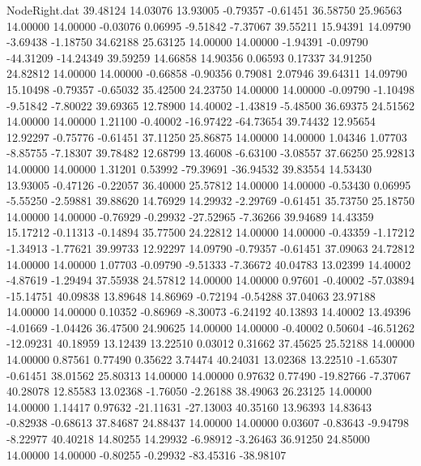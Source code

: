 \begin{filecontents}{NodeRight.dat}
  39.48124   14.03076   13.93005    -0.79357   -0.61451   36.58750   25.96563   14.00000   14.00000   -0.03076    0.06995   -9.51842   -7.37067
  39.55211   15.94391   14.09790    -3.69438   -1.18750   34.62188   25.63125   14.00000   14.00000   -1.94391   -0.09790  -44.31209  -14.24349
  39.59259   14.66858   14.90356     0.06593    0.17337   34.91250   24.82812   14.00000   14.00000   -0.66858   -0.90356    0.79081    2.07946
  39.64311   14.09790   15.10498    -0.79357   -0.65032   35.42500   24.23750   14.00000   14.00000   -0.09790   -1.10498   -9.51842   -7.80022
  39.69365   12.78900   14.40002    -1.43819   -5.48500   36.69375   24.51562   14.00000   14.00000    1.21100   -0.40002  -16.97422  -64.73654
  39.74432   12.95654   12.92297    -0.75776   -0.61451   37.11250   25.86875   14.00000   14.00000    1.04346    1.07703   -8.85755   -7.18307
  39.78482   12.68799   13.46008    -6.63100   -3.08557   37.66250   25.92813   14.00000   14.00000    1.31201    0.53992  -79.39691  -36.94532
  39.83554   14.53430   13.93005    -0.47126   -0.22057   36.40000   25.57812   14.00000   14.00000   -0.53430    0.06995   -5.55250   -2.59881
  39.88620   14.76929   14.29932    -2.29769   -0.61451   35.73750   25.18750   14.00000   14.00000   -0.76929   -0.29932  -27.52965   -7.36266
  39.94689   14.43359   15.17212    -0.11313   -0.14894   35.77500   24.22812   14.00000   14.00000   -0.43359   -1.17212   -1.34913   -1.77621
  39.99733   12.92297   14.09790    -0.79357   -0.61451   37.09063   24.72812   14.00000   14.00000    1.07703   -0.09790   -9.51333   -7.36672
  40.04783   13.02399   14.40002    -4.87619   -1.29494   37.55938   24.57812   14.00000   14.00000    0.97601   -0.40002  -57.03894  -15.14751
  40.09838   13.89648   14.86969    -0.72194   -0.54288   37.04063   23.97188   14.00000   14.00000    0.10352   -0.86969   -8.30073   -6.24192
  40.13893   14.40002   13.49396    -4.01669   -1.04426   36.47500   24.90625   14.00000   14.00000   -0.40002    0.50604  -46.51262  -12.09231
  40.18959   13.12439   13.22510     0.03012    0.31662   37.45625   25.52188   14.00000   14.00000    0.87561    0.77490    0.35622    3.74474
  40.24031   13.02368   13.22510    -1.65307   -0.61451   38.01562   25.80313   14.00000   14.00000    0.97632    0.77490  -19.82766   -7.37067
  40.28078   12.85583   13.02368    -1.76050   -2.26188   38.49063   26.23125   14.00000   14.00000    1.14417    0.97632  -21.11631  -27.13003
  40.35160   13.96393   14.83643    -0.82938   -0.68613   37.84687   24.88437   14.00000   14.00000    0.03607   -0.83643   -9.94798   -8.22977
  40.40218   14.80255   14.29932    -6.98912   -3.26463   36.91250   24.85000   14.00000   14.00000   -0.80255   -0.29932  -83.45316  -38.98107

\end{filecontents}
